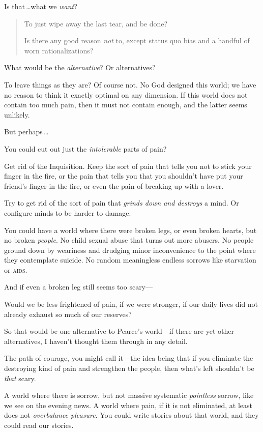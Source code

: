 Is that\,\ldots what we \textit{want}?

\begin{quote}

 To just wipe away the last tear, and be done?

{
 Is there any good reason \textit{not} to, except status quo bias
 and a handful of worn rationalizations?}
\end{quote}


 What would be the \textit{alternative}? Or alternatives?


 To leave things as they are? Of course not. No God designed this
world; we have no reason to think it exactly optimal on any dimension.
If this world does not contain too much pain, then it must not contain
enough, and the latter seems unlikely.


 But perhaps\,\ldots


 You could cut out just the \textit{intolerable} parts of pain?


 Get rid of the Inquisition. Keep the sort of pain that tells you
not to stick your finger in the fire, or the pain that tells you that
you shouldn't have put your friend's
finger in the fire, or even the pain of breaking up with a lover.

{
 Try to get rid of the sort of pain that \textit{grinds down and
destroys} a mind. Or configure minds to be harder to damage.}


 You could have a world where there were broken legs, or even
broken hearts, but no broken \textit{people}. No child sexual abuse
that turns out more abusers. No people ground down by weariness and
drudging minor inconvenience to the point where they contemplate
suicide. No random meaningless endless sorrows like starvation or
\textsc{aids}.


 And if even a broken leg still seems too scary---


 Would we be less frightened of pain, if we were stronger, if our
daily lives did not already exhaust so much of our reserves?


 So that would be one alternative to Pearce's
world---if there are yet other alternatives, I haven't
thought them through in any detail.


 The path of courage, you might call it---the idea being that if
you eliminate the destroying kind of pain and strengthen the people,
then what's left shouldn't be
\textit{that} scary.


 A world where there is sorrow, but not massive systematic
\textit{pointless} sorrow, like we see on the evening news. A world
where pain, if it is not eliminated, at least does not
\textit{overbalance pleasure}. You could write stories about that
world, and they could read our stories.


